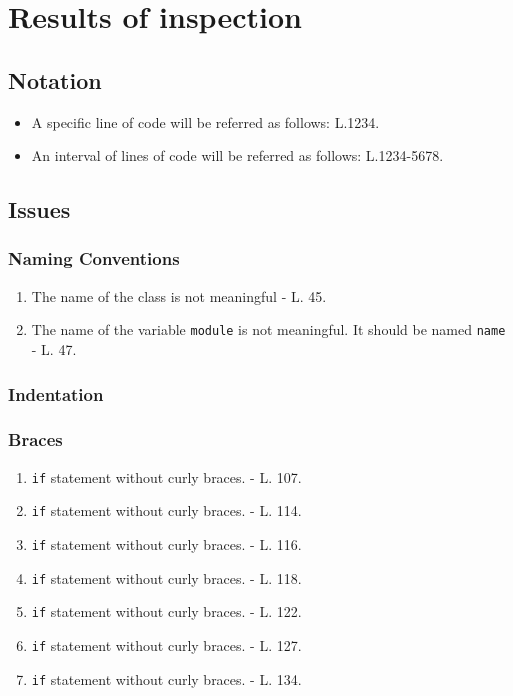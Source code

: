 \section{Results of inspection}

\subsection{Notation}

\begin{itemize}
	\item A specific line of code will be referred as follows: L.1234.
	\item An interval of lines of code will be referred as follows: L.1234-5678.
\end{itemize}

\subsection{Issues}

\subsubsection{Naming Conventions}

\begin{enumerate}
	\item The name of the class is not meaningful - L. 45.
	\item The name of the variable \texttt{module} is not meaningful. It should be named \texttt{name} - L. 47.
\end{enumerate}

\subsubsection{Indentation}

\subsubsection{Braces}

\begin{enumerate}
	\item \texttt{if} statement without curly braces. - L. 107.
	\item \texttt{if} statement without curly braces. - L. 114.
	\item \texttt{if} statement without curly braces. - L. 116.
	\item \texttt{if} statement without curly braces. - L. 118.
	\item \texttt{if} statement without curly braces. - L. 122.
	\item \texttt{if} statement without curly braces. - L. 127.
	\item \texttt{if} statement without curly braces. - L. 134.
\end{enumerate}

